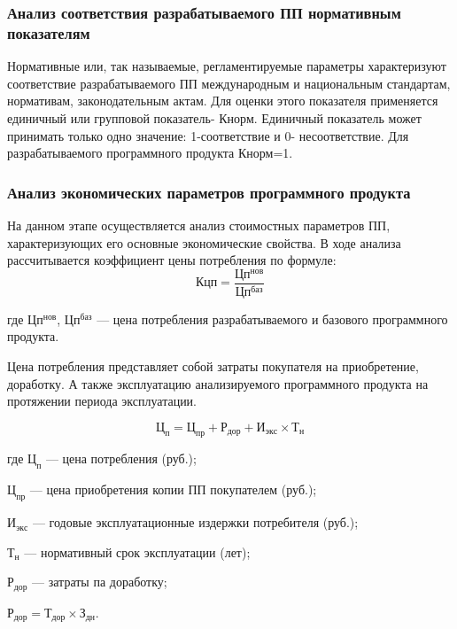 \subsubsection{Анализ соответствия разрабатываемого ПП нормативным показателям}
Нормативные или, так называемые, регламентируемые параметры характеризуют соответствие разрабатываемого
ПП международным и национальным стандартам, нормативам, законодательным актам. Для оценки этого
показателя применяется единичный или групповой показатель- Кнорм. Единичный показатель может принимать
только одно значение: 1-соответствие и 0- несоответствие. Для разрабатываемого программного продукта Кнорм=1.


\subsubsection{Анализ экономических параметров программного продукта}
На данном этапе осуществляется анализ стоимостных параметров ПП, характеризующих его основные экономические свойства.
В ходе анализа рассчитывается коэффициент цены потребления по  формуле:
\begin{equation}Кцп = \frac{Цп^{нов}}{Цп^{баз}}\end{equation}

\begin{ESKDexplanation}
	\item[где ] $Цп^{нов}$, $Цп^{баз}$ --- цена потребления разрабатываемого и базового программного продукта.
\end{ESKDexplanation}

Цена потребления представляет собой затраты покупателя на приобретение, доработку.
А также эксплуатацию анализируемого программного продукта на протяжении периода эксплуатации.

\begin{equation}
	Ц_{п} = Ц_{пр} + Р_{дор} + И_{экс} \times{} Т_{н}
\end{equation}

\begin{ESKDexplanation}
	\item[где ]{} $Ц_{п}$ --- цена потребления (руб.);
	\item{} $Ц_{пр}$ --- цена приобретения копии ПП покупателем (руб.);
	\item{} $И_{экс}$ --- годовые эксплуатационные издержки потребителя (руб.);
	\item{} $Т_{н}$ --- нормативный срок эксплуатации (лет);
	\item{} $Р_{дор}$ --- затраты па доработку;
\end{ESKDexplanation}
$Р_{дор} = Т_{дор} \times З_{дн}$.

